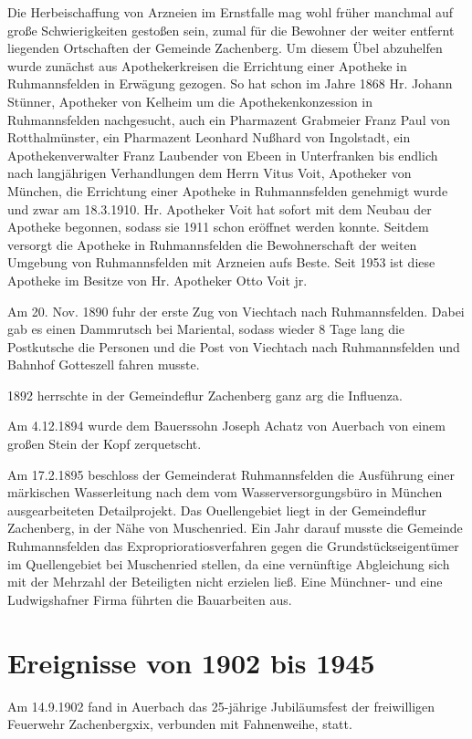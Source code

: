 \documentclass[12pt,a4pager]{book}
\begin{document}
Die Herbeischaffung von Arzneien im Ernstfalle mag wohl früher manchmal auf
große Schwierigkeiten gestoßen sein, zumal für die Bewohner der weiter entfernt
liegenden Ortschaften der Gemeinde Zachenberg. Um diesem Übel abzuhelfen wurde
zunächst aus Apothekerkreisen die Errichtung einer Apotheke in Ruhmannsfelden in
Erwägung gezogen. So hat schon im Jahre 1868 Hr. Johann Stünner, Apotheker von
Kelheim um die Apothekenkonzession in Ruhmannsfelden nachgesucht, auch ein
Pharmazent Grabmeier Franz Paul von Rotthalmünster, ein Pharmazent Leonhard
Nußhard von Ingolstadt, ein Apothekenverwalter Franz Laubender von Ebeen in
Unterfranken bis endlich nach langjährigen Verhandlungen dem Herrn Vitus Voit,
Apotheker von München, die Errichtung einer Apotheke in Ruhmannsfelden genehmigt
wurde und zwar am 18.3.1910. Hr. Apotheker Voit hat sofort mit dem Neubau der
Apotheke begonnen, sodass sie 1911 schon eröffnet werden konnte. Seitdem
versorgt die Apotheke in Ruhmannsfelden die Bewohnerschaft der weiten Umgebung
von Ruhmannsfelden mit Arzneien aufs Beste. Seit 1953 ist diese Apotheke im
Besitze von Hr. Apotheker Otto Voit jr.

Am 20. Nov. 1890 fuhr der erste Zug von Viechtach nach Ruhmannsfelden. Dabei gab
es einen Dammrutsch bei Mariental, sodass wieder 8 Tage lang die Postkutsche die
Personen und die Post von Viechtach nach Ruhmannsfelden und Bahnhof Gotteszell
fahren musste.

1892 herrschte in der Gemeindeflur Zachenberg ganz arg die Influenza.

Am 4.12.1894 wurde dem Bauerssohn Joseph Achatz von Auerbach von einem großen
Stein der Kopf zerquetscht.

Am 17.2.1895 beschloss der Gemeinderat Ruhmannsfelden die Ausführung einer
märkischen Wasserleitung nach dem vom Wasserversorgungsbüro in München
ausgearbeiteten Detailprojekt. Das Ouellengebiet liegt in der Gemeindeflur
Zachenberg, in der Nähe von Muschenried. Ein Jahr darauf musste die Gemeinde
Ruhmannsfelden das Exproprioratiosverfahren gegen die Grundstückseigentümer im
Quellengebiet bei Muschenried stellen, da eine vernünftige Abgleichung sich mit
der Mehrzahl der Beteiligten nicht erzielen ließ. Eine Münchner- und eine
Ludwigshafner Firma führten die Bauarbeiten aus.

\section{Ereignisse von 1902 bis 1945}

Am 14.9.1902 fand in Auerbach das 25-jährige Jubiläumsfest der freiwilligen
Feuerwehr Zachenbergxix, verbunden mit Fahnenweihe, statt.
\end{document}
